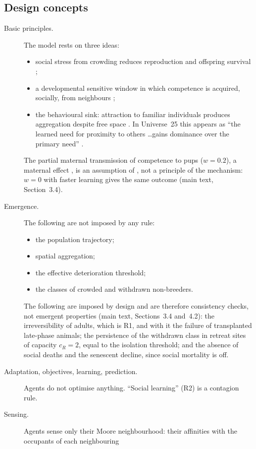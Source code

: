 \documentclass[preprint,12pt,authoryear]{elsarticle}
\begin{document}
\subsection*{Design concepts}
\begin{description}
\item[Basic principles.] The model rests on three ideas:
  \begin{itemize}
  \item social stress from crowding reduces reproduction and offspring survival
    \citep{Christian1950,Southwick1955};
  \item a developmental sensitive window in which competence is acquired, socially, from neighbours
    \citep{FawcettFrankenhuis2015};
  \item the behavioural sink: attraction to familiar individuals produces aggregation despite free space
    \citep{Calhoun1962}. In Universe~25 this appears as ``the learned need for proximity to others \ldots gains
    dominance over the primary need'' \citep{Calhoun1973}.
  \end{itemize}
  The partial maternal transmission of competence to pups ($w=0.2$), a maternal effect
  \citep{GinzburgTaneyhill1994,InchaustiGinzburg1998}, is an assumption of \Cone, not a principle of the mechanism:
  $w=0$ with faster learning gives the same outcome (main text, Section~3.4).
\item[Emergence.] The following are not imposed by any rule:
  \begin{itemize}
  \item the population trajectory;
  \item spatial aggregation;
  \item the effective deterioration threshold;
  \item the classes of crowded and withdrawn non-breeders.
  \end{itemize}
  The following are imposed by design and are therefore consistency checks, not emergent properties
  (main text, Sections~3.4 and~4.2): the irreversibility of adults, which is R1, and with it the failure of transplanted
  late-phase animals; the persistence of the withdrawn class in retreat sites of capacity $c_R=2$, equal to the isolation
  threshold; and the absence of social deaths and the senescent decline, since social mortality is off.
\item[Adaptation, objectives, learning, prediction.] Agents do not optimise anything. ``Social learning'' (R2) is a
  contagion rule.
\item[Sensing.] Agents sense only their Moore neighbourhood: their affinities with the occupants of each neighbouring

\end{description}
\end{document}
